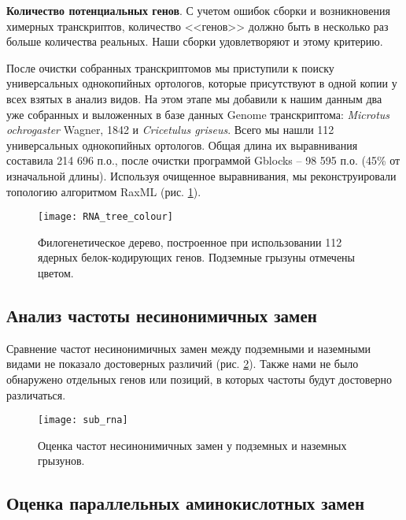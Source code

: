 \textbf{Количество потенциальных генов}. С учетом ошибок сборки и возникновения химерных транскриптов, количество <<генов>> должно быть в несколько раз больше количества реальных. Наши сборки удовлетворяют и этому критерию.  

После очистки собранных транскриптомов мы приступили к поиску универсальных однокопийных ортологов, которые присутствуют в одной копии у всех взятых в анализ видов. На этом этапе мы добавили к нашим данным два уже собранных и выложенных в базе данных Genome транскриптома: \textit{Microtus ochrogaster} Wagner, 1842 и \textit{Cricetulus griseus}. Всего мы нашли 112 универсальных однокопийных ортологов. Общая длина их выравнивания составила 214 696 п.о., после очистки программой Gblocks -- 98 595 п.о. (45\% от изначальной длины). Используя очищенное выравнивания, мы реконструировали топологию алгоритмом RaxML (рис. \ref{tree_RNA}).

\begin{figure}[h!]
	\begin{center}
		\texttt{[image: RNA\_tree\_colour]}
	\end{center}
	\caption{Филогенетическое дерево, построенное при использовании 112 ядерных белок-кодирующих генов. Подземные грызуны отмечены цветом.}\label{tree_RNA}
\end{figure}

\subsection{Анализ частоты несинонимичных замен}

Сравнение частот несинонимичных замен между подземными и наземными видами не показало достоверных различий (рис. \ref{sub_RNA}). Также нами не было обнаружено отдельных генов  или позиций, в которых частоты будут достоверно различаться. 

\begin{figure}[h!]
	\begin{center}
		\texttt{[image: sub\_rna]}
	\end{center}
	\caption{Оценка частот несинонимичных замен у подземных и наземных грызунов.}\label{sub_RNA}
\end{figure}

\subsection{Оценка параллельных аминокислотных замен}

